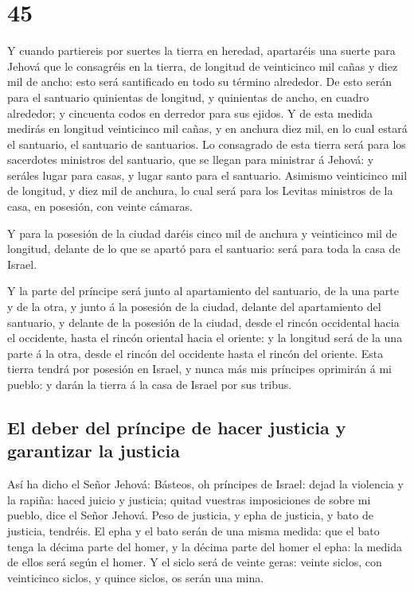 \hypertarget{section-26-45}{%
\section{45}\label{section-26-45}}

 Y cuando partiereis por suertes la tierra en heredad,
apartaréis una suerte para Jehová que le consagréis en la tierra, de
longitud de veinticinco mil cañas y diez mil de ancho: esto será
santificado en todo su término alrededor.  De esto serán
para el santuario quinientas de longitud, y quinientas de ancho, en
cuadro alrededor; y cincuenta codos en derredor para sus ejidos.
 Y de esta medida medirás en longitud veinticinco mil
cañas, y en anchura diez mil, en lo cual estará el santuario, el
santuario de santuarios.  Lo consagrado de esta tierra
será para los sacerdotes ministros del santuario, que se llegan para
ministrar á Jehová: y seráles lugar para casas, y lugar santo para el
santuario.  Asimismo veinticinco mil de longitud, y diez
mil de anchura, lo cual será para los Levitas ministros de la casa, en
posesión, con veinte cámaras.

 Y para la posesión de la ciudad daréis cinco mil de
anchura y veinticinco mil de longitud, delante de lo que se apartó para
el santuario: será para toda la casa de Israel.

 Y la parte del príncipe será junto al apartamiento del
santuario, de la una parte y de la otra, y junto á la posesión de la
ciudad, delante del apartamiento del santuario, y delante de la posesión
de la ciudad, desde el rincón occidental hacia el occidente, hasta el
rincón oriental hacia el oriente: y la longitud será de la una parte á
la otra, desde el rincón del occidente hasta el rincón del oriente.
 Esta tierra tendrá por posesión en Israel, y nunca más
mis príncipes oprimirán á mi pueblo: y darán la tierra á la casa de
Israel por sus tribus.

\hypertarget{el-deber-del-pruxedncipe-de-hacer-justicia-y-garantizar-la-justicia}{%
\subsection{El deber del príncipe de hacer justicia y garantizar la
justicia}\label{el-deber-del-pruxedncipe-de-hacer-justicia-y-garantizar-la-justicia}}

 Así ha dicho el Señor Jehová: Básteos, oh príncipes de
Israel: dejad la violencia y la rapiña: haced juicio y justicia; quitad
vuestras imposiciones de sobre mi pueblo, dice el Señor Jehová.
 Peso de justicia, y epha de justicia, y bato de
justicia, tendréis.  El epha y el bato serán de una misma
medida: que el bato tenga la décima parte del homer, y la décima parte
del homer el epha: la medida de ellos será según el homer.
 Y el siclo será de veinte geras: veinte siclos, con
veinticinco siclos, y quince siclos, os serán una mina.

